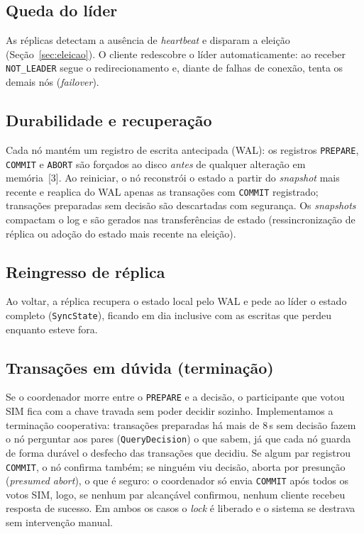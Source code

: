 \documentclass[10pt,twocolumn]{article}
\begin{document}
\subsection{Queda do líder}

As réplicas detectam a ausência de \emph{heartbeat} e disparam a eleição
(Seção~\ref{sec:eleicao}). O cliente redescobre o líder automaticamente:
ao receber \texttt{NOT\_LEADER} segue o redirecionamento e, diante de
falhas de conexão, tenta os demais nós (\emph{failover}).

\subsection{Durabilidade e recuperação}

Cada nó mantém um registro de escrita antecipada (WAL): os registros
\texttt{PREPARE}, \texttt{COMMIT} e \texttt{ABORT} são forçados ao disco
\emph{antes} de qualquer alteração em memória~[3]. Ao reiniciar, o nó
reconstrói o estado a partir do \emph{snapshot} mais recente e reaplica do
WAL apenas as transações com \texttt{COMMIT} registrado; transações
preparadas sem decisão são descartadas com segurança. Os \emph{snapshots}
compactam o log e são gerados nas transferências de estado (ressincronização
de réplica ou adoção do estado mais recente na eleição).

\subsection{Reingresso de réplica}

Ao voltar, a réplica recupera o estado local pelo WAL e pede ao líder o
estado completo (\texttt{SyncState}), ficando em dia inclusive com as
escritas que perdeu enquanto esteve fora.

\subsection{Transações em dúvida (terminação)}
\label{sec:term}

Se o coordenador morre entre o \texttt{PREPARE} e a decisão, o participante
que votou SIM fica com a chave travada sem poder decidir sozinho.
Implementamos a terminação cooperativa: transações preparadas há mais de
8\,s sem decisão fazem o nó perguntar aos pares (\texttt{QueryDecision}) o
que sabem, já que cada nó guarda de forma durável o desfecho das
transações que decidiu. Se algum par registrou \texttt{COMMIT}, o nó confirma também; se
ninguém viu decisão, aborta por presunção (\emph{presumed abort}), o que é
seguro: o coordenador só envia \texttt{COMMIT} após todos os votos SIM,
logo, se nenhum par alcançável confirmou, nenhum cliente recebeu resposta
de sucesso. Em ambos os casos o \emph{lock} é liberado e o sistema se
destrava sem intervenção manual.
\end{document}
